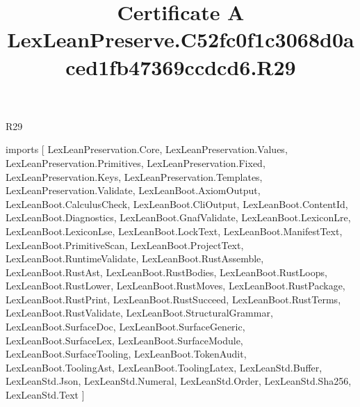 \begin{lexlean}{R29}
\title{Certificate A LexLeanPreserve.C52fc0f1c3068d0aced1fb47369ccdcd6.R29}
\begin{coremodule}
imports [
  LexLeanPreservation.Core,
  LexLeanPreservation.Values,
  LexLeanPreservation.Primitives,
  LexLeanPreservation.Fixed,
  LexLeanPreservation.Keys,
  LexLeanPreservation.Templates,
  LexLeanPreservation.Validate,
  LexLeanBoot.AxiomOutput,
  LexLeanBoot.CalculusCheck,
  LexLeanBoot.CliOutput,
  LexLeanBoot.ContentId,
  LexLeanBoot.Diagnostics,
  LexLeanBoot.GnafValidate,
  LexLeanBoot.LexiconLre,
  LexLeanBoot.LexiconLse,
  LexLeanBoot.LockText,
  LexLeanBoot.ManifestText,
  LexLeanBoot.PrimitiveScan,
  LexLeanBoot.ProjectText,
  LexLeanBoot.RuntimeValidate,
  LexLeanBoot.RustAssemble,
  LexLeanBoot.RustAst,
  LexLeanBoot.RustBodies,
  LexLeanBoot.RustLoops,
  LexLeanBoot.RustLower,
  LexLeanBoot.RustMoves,
  LexLeanBoot.RustPackage,
  LexLeanBoot.RustPrint,
  LexLeanBoot.RustSucceed,
  LexLeanBoot.RustTerms,
  LexLeanBoot.RustValidate,
  LexLeanBoot.StructuralGrammar,
  LexLeanBoot.SurfaceDoc,
  LexLeanBoot.SurfaceGeneric,
  LexLeanBoot.SurfaceLex,
  LexLeanBoot.SurfaceModule,
  LexLeanBoot.SurfaceTooling,
  LexLeanBoot.TokenAudit,
  LexLeanBoot.ToolingAst,
  LexLeanBoot.ToolingLatex,
  LexLeanStd.Buffer,
  LexLeanStd.Json,
  LexLeanStd.Numeral,
  LexLeanStd.Order,
  LexLeanStd.Sha256,
  LexLeanStd.Text
]


\end{coremodule}
\end{lexlean}
